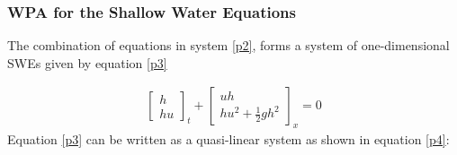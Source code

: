 \documentclass[11pt,a4paper]{article}
\begin{document}
	\subsubsection{WPA for the Shallow Water Equations}
	The combination of equations in system \eqref{p2}, forms a system of one-dimensional SWEs given by equation \eqref{p3}
	
	\begin{eqnarray}
		\begin{bmatrix} h \\ hu \end{bmatrix}_t + \begin{bmatrix} uh \\ hu^{2} + \frac{1}{2} gh^{2} \end{bmatrix}_x  = 0 
		\label{p3}
	\end{eqnarray}
	Equation \eqref{p3} can be written as a quasi-linear system as shown in equation \eqref{p4}:
	
\end{document}
